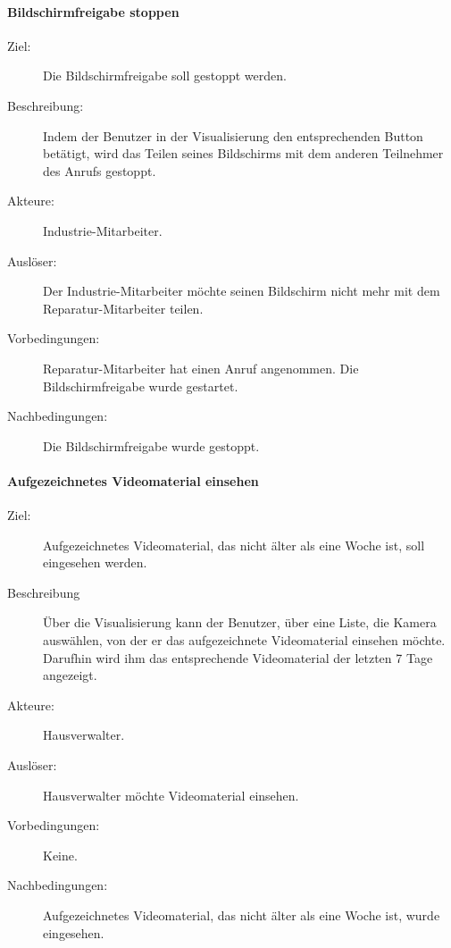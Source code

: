 \paragraph{Bildschirmfreigabe stoppen}
    \begin{description}
        \item[Ziel:] Die Bildschirmfreigabe soll gestoppt werden.
        \item[Beschreibung:] Indem der Benutzer in der Visualisierung den entsprechenden Button betätigt, wird das Teilen seines Bildschirms mit dem anderen Teilnehmer des Anrufs gestoppt.
        \item[Akteure:] Industrie-Mitarbeiter.
        \item[Auslöser:] Der Industrie-Mitarbeiter möchte seinen Bildschirm nicht mehr mit dem Reparatur-Mitarbeiter teilen.
        \item[Vorbedingungen:] Reparatur-Mitarbeiter hat einen Anruf angenommen.
            Die Bildschirmfreigabe wurde gestartet.
        \item[Nachbedingungen:] Die Bildschirmfreigabe wurde gestoppt.
    \end{description}

\paragraph{Aufgezeichnetes Videomaterial einsehen}
    \begin{description}
        \item[Ziel:] Aufgezeichnetes Videomaterial, das nicht älter als eine Woche ist, soll eingesehen werden.
        \item[Beschreibung] Über die Visualisierung kann der Benutzer, über eine Liste, die Kamera auswählen, von der er das aufgezeichnete Videomaterial einsehen möchte.
            Darufhin wird ihm das entsprechende Videomaterial der letzten 7 Tage angezeigt.
        \item[Akteure:] Hausverwalter.
        \item[Auslöser:] Hausverwalter möchte Videomaterial einsehen.
        \item[Vorbedingungen:] Keine.
        \item[Nachbedingungen:] Aufgezeichnetes Videomaterial, das nicht älter als eine Woche ist, wurde eingesehen.
    \end{description}